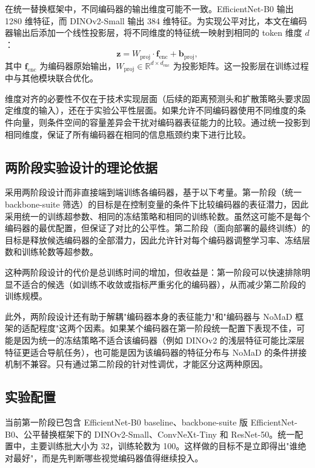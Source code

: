在统一替换框架中，不同编码器的输出维度可能不一致。EfficientNet-B0 输出 1280 维特征，而 DINOv2-Small 输出 384 维特征。为实现公平对比，本文在编码器输出后添加一个线性投影层，将不同维度的特征统一映射到相同的 token 维度 $d$：
\begin{equation}
\mathbf{z} = W_{\text{proj}} \cdot \mathbf{f}_{\text{enc}} + \mathbf{b}_{\text{proj}},
\end{equation}
其中 $\mathbf{f}_{\text{enc}}$ 为编码器原始输出，$W_{\text{proj}} \in \mathbb{R}^{d \times d_{\text{enc}}}$ 为投影矩阵。这一投影层在训练过程中与其他模块联合优化。

维度对齐的必要性不仅在于技术实现层面（后续的距离预测头和扩散策略头要求固定维度的输入），还在于实验公平性层面。如果允许不同编码器使用不同维度的条件向量，则条件空间的容量差异会干扰对编码器表征能力的比较。通过统一投影到相同维度，保证了所有编码器在相同的信息瓶颈约束下进行比较。

\subsection{两阶段实验设计的理论依据}

采用两阶段设计而非直接端到端训练各编码器，基于以下考量。第一阶段（统一 backbone-suite 筛选）的目标是在控制变量的条件下比较编码器的表征潜力，因此采用统一的训练超参数、相同的冻结策略和相同的训练轮数。虽然这可能不是每个编码器的最优配置，但保证了对比的公平性。第二阶段（面向部署的最终训练）的目标是释放候选编码器的全部潜力，因此允许针对每个编码器调整学习率、冻结层数和训练轮数等超参数。

这种两阶段设计的代价是总训练时间的增加，但收益是：第一阶段可以快速排除明显不适合的候选（如训练不收敛或指标严重劣化的编码器），从而减少第二阶段的训练规模。

此外，两阶段设计还有助于解耦"编码器本身的表征能力"和"编码器与 NoMaD 框架的适配程度"这两个因素。如果某个编码器在第一阶段统一配置下表现不佳，可能是因为统一的冻结策略不适合该编码器（例如 DINOv2 的浅层特征可能比深层特征更适合导航任务），也可能是因为该编码器的特征分布与 NoMaD 的条件拼接机制不兼容。只有通过第二阶段的针对性调优，才能区分这两种原因。

\subsection{实验配置}

当前第一阶段已包含 EfficientNet-B0 baseline、backbone-suite 版 EfficientNet-B0、公平替换框架下的 DINOv2-Small\cite{dinov2_2023}、ConvNeXt-Tiny\cite{convnext2022} 和 ResNet-50\cite{resnet2016}。统一配置中，主要训练批大小为 32，训练轮数为 100。这样做的目标不是立即得出"谁绝对最好"，而是先判断哪些视觉编码器值得继续投入。

